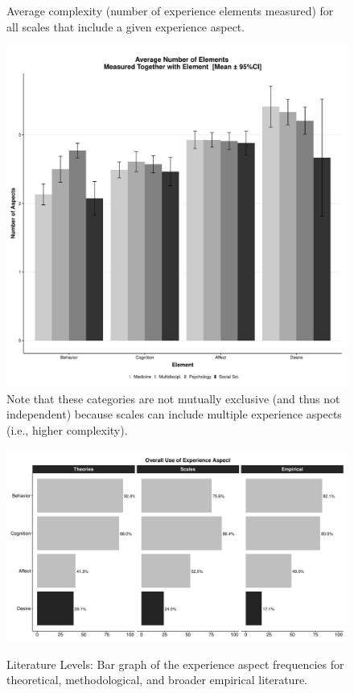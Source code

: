 \begin{figure}[h]
\centering
\caption{Average complexity (number of experience elements measured) for all scales that include a given experience aspect.}
\includegraphics[width=\textwidth]{Figures/FieldElementComp-1}
\caption*{Note that these categories are not mutually exclusive (and thus not independent) because scales can include multiple experience aspects (i.e., higher complexity).}
\label{fig:FieldElementComp}
\end{figure}

\begin{figure}[h]
\centering
\caption{Literature Levels: Bar graph of the experience aspect frequencies for theoretical, methodological, and broader empirical literature.}
\includegraphics[width=\textwidth]{Figures/CombinedABCDBar-1}
\label{fig:CombinedAspects}
\end{figure}

